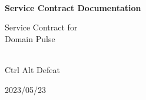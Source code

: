 \begin{titlepage}
    \centering


    
    \vspace{2cm}
    \hrulefill\\
    \vspace{1cm}
    {\Huge\bfseries Service Contract Documentation}
    
    \vspace{1cm}
    
    {\Large Service Contract for\\Domain Pulse}\\
    \vspace{1cm}
    \hrulefill\\
    
    \vfill
    
    {\large Ctrl Alt Defeat}
    
    \vspace{1cm}
    
    {\large 2023/05/23}\\

    
\end{titlepage}